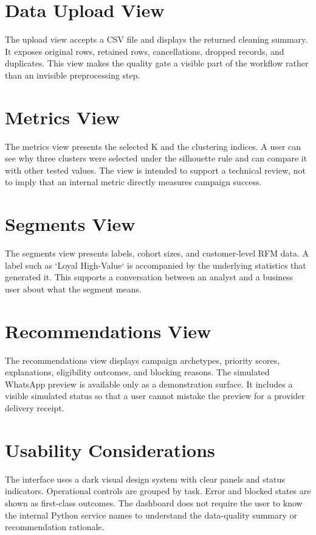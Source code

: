 \documentclass[12pt,a4paper]{report}
\begin{document}
\section{Data Upload View}
The upload view accepts a CSV file and displays the returned cleaning summary. It exposes original rows, retained rows, cancellations, dropped records, and duplicates. This view makes the quality gate a visible part of the workflow rather than an invisible preprocessing step.

\section{Metrics View}
The metrics view presents the selected K and the clustering indices. A user can see why three clusters were selected under the silhouette rule and can compare it with other tested values. The view is intended to support a technical review, not to imply that an internal metric directly measures campaign success.

\section{Segments View}
The segments view presents labels, cohort sizes, and customer-level RFM data. A label such as `Loyal High-Value` is accompanied by the underlying statistics that generated it. This supports a conversation between an analyst and a business user about what the segment means.

\section{Recommendations View}
The recommendations view displays campaign archetypes, priority scores, explanations, eligibility outcomes, and blocking reasons. The simulated WhatsApp preview is available only as a demonstration surface. It includes a visible simulated status so that a user cannot mistake the preview for a provider delivery receipt.

\section{Usability Considerations}
The interface uses a dark visual design system with clear panels and status indicators. Operational controls are grouped by task. Error and blocked states are shown as first-class outcomes. The dashboard does not require the user to know the internal Python service names to understand the data-quality summary or recommendation rationale.
\end{document}
